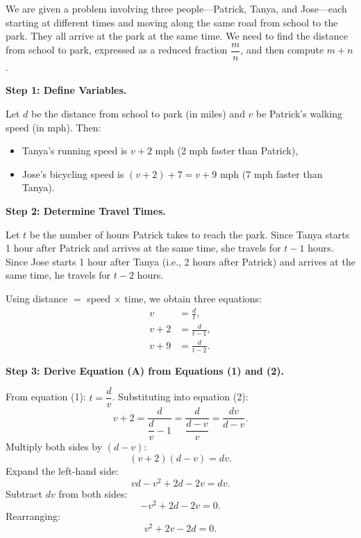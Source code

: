 \documentclass{article}
\begin{document}
\begin{tcolorbox}[title=Teacher Model, breakable]
We are given a problem involving three people---Patrick, Tanya, and Jose---each                                                                                                
starting at different times and moving along the same road from school to the                                                                                                  
park. They all arrive at the park at the same time. We need to find the distance                                                                                               
from school to park, expressed as a reduced fraction $\dfrac{m}{n}$, and then
compute $m+n$.                                                                                                                                                                 
              
\medskip                                                                                                                                                                       
\textbf{Step 1: Define Variables.}

Let $d$ be the distance from school to park (in miles) and $v$ be Patrick's
walking speed (in mph). Then:
\begin{itemize}
  \item Tanya's running speed is $v+2$ mph (2 mph faster than Patrick),
  \item Jose's bicycling speed is $(v+2)+7 = v+9$ mph (7 mph faster than Tanya).
\end{itemize}

\medskip
\textbf{Step 2: Determine Travel Times.}

Let $t$ be the number of hours Patrick takes to reach the park. Since Tanya
starts 1 hour after Patrick and arrives at the same time, she travels for
$t-1$ hours. Since Jose starts 1 hour after Tanya (i.e., 2 hours after
Patrick) and arrives at the same time, he travels for $t-2$ hours.

Using distance $=$ speed $\times$ time, we obtain three equations:
\begin{align}
v &= \frac{d}{t}, \tag{1}\\[6pt]
v+2 &= \frac{d}{t-1}, \tag{2}\\[6pt]
v+9 &= \frac{d}{t-2}. \tag{3}
\end{align}

\medskip
\textbf{Step 3: Derive Equation (A) from Equations (1) and (2).}

From equation (1): $t = \dfrac{d}{v}$. Substituting into equation (2):
\[
v+2 = \frac{d}{\dfrac{d}{v}-1} = \frac{d}{\dfrac{d-v}{v}} = \frac{dv}{d-v}.
\]
Multiply both sides by $(d-v)$:
\[
(v+2)(d-v) = dv.
\]
Expand the left-hand side:
\[
vd - v^2 + 2d - 2v = dv.
\]
Subtract $dv$ from both sides:
\[
-v^2 + 2d - 2v = 0.
\]
Rearranging:
\[
v^2 + 2v - 2d = 0. \tag{A}
\]


\end{tcolorbox}
\end{document}
